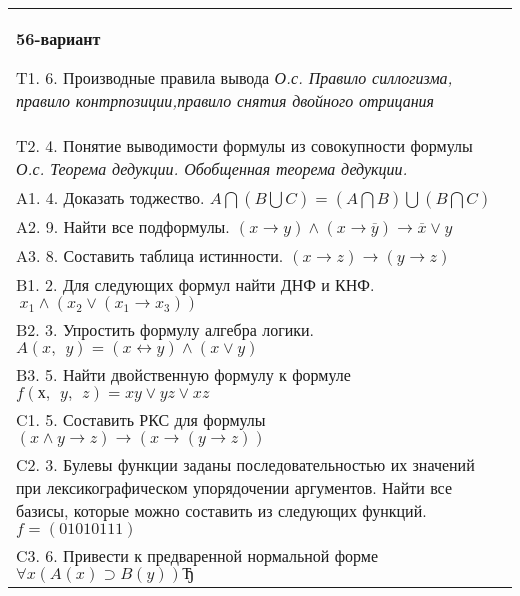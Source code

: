 \documentclass{article}
\begin{document}
\begin{tabular}{m{17cm}}
\textbf{56-вариант}
\newline

T1. 6. Производные правила вывода \emph{О.с. Правило силлогизма, правило контрпозиции,правило снятия двойного отрицания} \\
T2. 4. Понятие выводимости формулы из совокупности формулы \emph{О.с. Теорема дедукции. Обобщенная теорема дедукции.} \\
A1. 4. Доказать тоджество. \(A\bigcap(B\bigcup C) = (A\bigcap B)\bigcup(B\bigcap C)\) \\
A2. 9. Найти все подформулы. \((x \rightarrow y) \land (x \rightarrow \overline{y}) \rightarrow \overline{x} \vee y\) \\
A3. 8. Составить таблица истинности. \((x \rightarrow z) \rightarrow (y \rightarrow z)\) \\
B1. 2. Для следующих формул найти ДНФ и КНФ. \(\ x_{1} \land (x_{2} \vee (x_{1} \rightarrow x_{3}))\) \\
B2. 3. Упростить формулу алгебра логики. \(A(x,\ \ y) = (x \leftrightarrow y) \land (x \vee y)\) \\
B3. 5. Найти двойственную формулу к формуле \(f(х,\ \ y,\ \ z) = xy \vee yz \vee xz\) \\
C1. 5. Составить РКС для формулы \((x \land y \rightarrow z) \rightarrow (x \rightarrow (y \rightarrow z))\) \\
C2. 3. Булевы функции заданы последовательностью их значений при лексикографическом упорядочении аргументов. Найти все базисы, которые можно составить из следующих функций. \(f = (01010111)\) \\
C3. 6. Привести к предваренной нормальной форме \(\forall x(A(x) \supset B(y))Ђ\) \\

\end{tabular}
\vspace{1cm}
\end{document}
